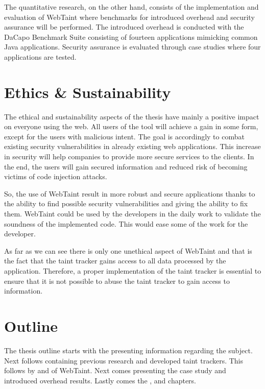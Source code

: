 The quantitative research, on the other hand, consists of the implementation and evaluation of WebTaint where benchmarks for introduced overhead and security assurance will be performed. The introduced overhead is conducted with the DaCapo Benchmark Suite \parencite{dacapo} consisting of fourteen applications mimicking common Java applications. Security assurance is evaluated through case studies where four applications are tested.



\section{Ethics \& Sustainability}
\label{Ethics}
The ethical and sustainability aspects of the thesis have mainly a positive impact on everyone using the web. All users of the tool will achieve a gain in some form, except for the users with malicious intent. The goal is accordingly to combat existing security vulnerabilities in already existing web applications. This increase in security will help companies to provide more secure services to the clients. In the end, the users will gain secured information and reduced risk of becoming victims of code injection attacks.

So, the use of WebTaint result in more robust and secure applications thanks to the ability to find possible security vulnerabilities and giving the ability to fix them. WebTaint could be used by the developers in the daily work to validate the soundness of the implemented code. This would ease some of the work for the developer.

As far as we can see there is only one unethical aspect of WebTaint and that is the fact that the taint tracker gains access to all data processed by the application. Therefore, a proper implementation of the taint tracker is essential to ensure that it is not possible to abuse the taint tracker to gain access to information.



\section{Outline}
\label{Outline}
The thesis outline starts with the \textit{} presenting information regarding the subject. Next follows \textit{} containing previous research and developed taint trackers. This follows by \textit{} and \textit{} of WebTaint. Next comes \textit{} presenting the case study and introduced overhead results. Lastly comes the \textit{}, \textit{} and \textit{} chapters.

